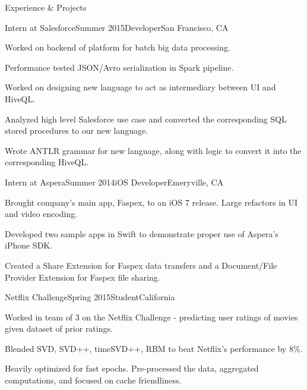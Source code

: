 \documentclass{resume} %
\begin{document}

\begin{rSection}{Experience \& Projects}

    \begin{rSubsection}{Intern at Salesforce}{Summer 2015}{Developer}{San Francisco, CA}
\item Worked on backend of platform for batch big data processing.
\item Performance tested JSON/Avro serialization in Spark pipeline.
\item Worked on designing new language to act as intermediary between UI and HiveQL.
\item Analyzed high level Salesforce use case and converted the corresponding SQL stored procedures to
    our new language.
\item Wrote ANTLR grammar for new language, along with logic to convert it into the corresponding HiveQL.
\end{rSubsection}


\begin{rSubsection}{Intern at Aspera}{Summer 2014}{iOS Developer}{Emeryville, CA}
\item Brought company's main app, Faspex, to an iOS 7 release. Large refactors in
    UI and video encoding.
\item Developed two sample apps in Swift to demonstrate proper use of Aspera's iPhone
    SDK.
\item Created a Share Extension for Faspex data transfers and a Document/File Provider Extension
    for Faspex file sharing.
\end{rSubsection}


\begin{rSubsection}{Netflix Challenge}{Spring 2015}{Student}{California}
\item Worked in team of 3 on the Netflix Challenge - predicting user ratings of movies given dataset of prior ratings.
\item Blended SVD, SVD++, timeSVD++, RBM to beat Netflix's performance by  8\%.
\item Heavily optimized for fast epochs. Pre-processed the data, aggregated
    computations, and focused on cache friendliness.
\end{rSubsection}


\end{rSection}
\end{document}
